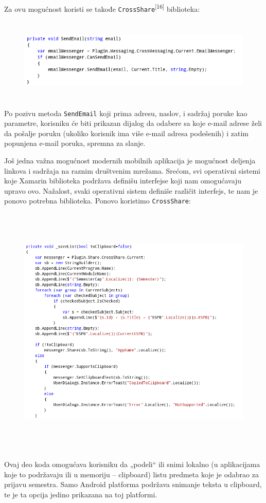 \documentclass[a4paper]{article}
\begin{document}
Za ovu mogućnost koristi se takođe
\texttt{\textcolor[rgb]{0.0,0.4,0.8}{CrossShare}}\textsuperscript{[16]}
biblioteka:



\begin{figure}
\centering
\includegraphics[width=170mm,height=39.88mm]{msc-img74.png}
\end{figure}
Po pozivu metoda \texttt{\textcolor[rgb]{0.0,0.4,0.8}{SendEmail}} koji
prima adresu, naslov, i sadržaj poruke kao parametre, korisniku će biti
prikazan dijalog da odabere sa koje e-mail adrese želi da pošalje
poruku (ukoliko korisnik ima više e-mail adresa podešenih) i zatim
popunjena e-mail poruka, spremna za slanje.

Još jedna važna mogućnost modernih mobilnih aplikacija je mogućnost
deljenja linkova i sadržaja na raznim društvenim mrežama. Srećom, svi
operativni sistemi koje Xamarin biblioteka podržava definišu interfejse
koji nam omogućavaju upravo ovo. Nažalost, svaki operativni sistem
definiše različit interfejs, te nam je ponovo potrebna biblioteka.
Ponovo koristimo \texttt{\textcolor[rgb]{0.0,0.4,0.8}{CrossShare}}:



\begin{figure}
\centering
\includegraphics[width=151.15mm,height=121.87mm]{msc-img75.png}
\end{figure}
Ovaj deo koda omogućava korisniku da „podeli“ ili snimi lokalno (u
aplikacijama koje to podržavaju ili u memoriju – clipboard) listu
predmeta koje je odabrao za prijavu semestra. Samo Android platforma
podržava snimanje teksta u clipboard, te je ta opcija jedino prikazana
na toj platformi. 
\end{document}
